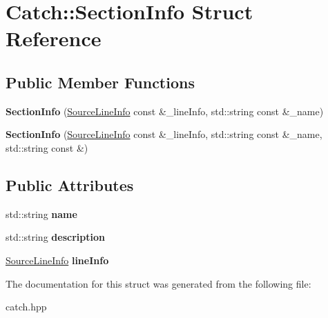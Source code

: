 \hypertarget{structCatch_1_1SectionInfo}{}\section{Catch\+::Section\+Info Struct Reference}
\label{structCatch_1_1SectionInfo}
\subsection*{Public Member Functions}
\begin{DoxyCompactItemize}
\item 
\mbox{\label{structCatch_1_1SectionInfo_a2808437ae7d4bc0830cee1c3995165a6}} 
{\bfseries Section\+Info} (\mbox{\hyperlink{structCatch_1_1SourceLineInfo}{Source\+Line\+Info}} const \&\+\_\+line\+Info, std\+::string const \&\+\_\+name)
\item 
\mbox{\label{structCatch_1_1SectionInfo_a139875f2e7bd12a5898a948f8bad15b3}} 
{\bfseries Section\+Info} (\mbox{\hyperlink{structCatch_1_1SourceLineInfo}{Source\+Line\+Info}} const \&\+\_\+line\+Info, std\+::string const \&\+\_\+name, std\+::string const \&)
\end{DoxyCompactItemize}
\subsection*{Public Attributes}
\begin{DoxyCompactItemize}
\item 
\mbox{\label{structCatch_1_1SectionInfo_a704c8fc662d309137e0d4f199cb7df58}} 
std\+::string {\bfseries name}
\item 
\mbox{\label{structCatch_1_1SectionInfo_a0052060219a6de74bb7ade34d4163a4e}} 
std\+::string {\bfseries description}
\item 
\mbox{\label{structCatch_1_1SectionInfo_adbc83b8a3507c4acc8ee249e93465711}} 
\mbox{\hyperlink{structCatch_1_1SourceLineInfo}{Source\+Line\+Info}} {\bfseries line\+Info}
\end{DoxyCompactItemize}


The documentation for this struct was generated from the following file\+:\begin{DoxyCompactItemize}
\item 
catch.\+hpp\end{DoxyCompactItemize}
